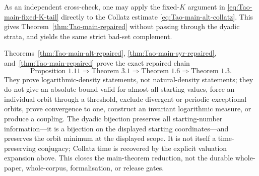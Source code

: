As an independent cross-check, one may apply the fixed-\(K\) argument in
\eqref{eq:Tao-main-fixed-K-tail} directly to the Collatz estimate
\eqref{eq:Tao-main-alt-collatz}.  This gives
Theorem~\ref{thm:Tao-main-repaired} without passing through the dyadic
strata, and yields the same strict bad-set complement.

\begin{nonclaim}
Theorems~\ref{thm:Tao-main-alt-repaired},
\ref{thm:Tao-main-syr-repaired}, and~\ref{thm:Tao-main-repaired} prove the
exact repaired chain
\[
 \text{Proposition~1.11}\Longrightarrow\text{Theorem~3.1}
 \Longrightarrow\text{Theorem~1.6}
 \Longrightarrow\text{Theorem~1.3}.
\]
They prove logarithmic-density statements, not natural-density statements;
they do not give an absolute bound valid for almost all starting values,
force an individual orbit through a threshold, exclude divergent or
periodic exceptional orbits, prove convergence to one, construct an
 invariant logarithmic measure, or produce a coupling.  The dyadic bijection
preserves all starting-number information---it is a bijection on the
displayed starting coordinates---and preserves the orbit minimum at the
displayed scope.  It is not itself a time-preserving conjugacy; Collatz time
is recovered by the explicit valuation expansion above.
This closes the main-theorem reduction, not the durable whole-paper,
whole-corpus, formalisation, or release gates.
\end{nonclaim}
